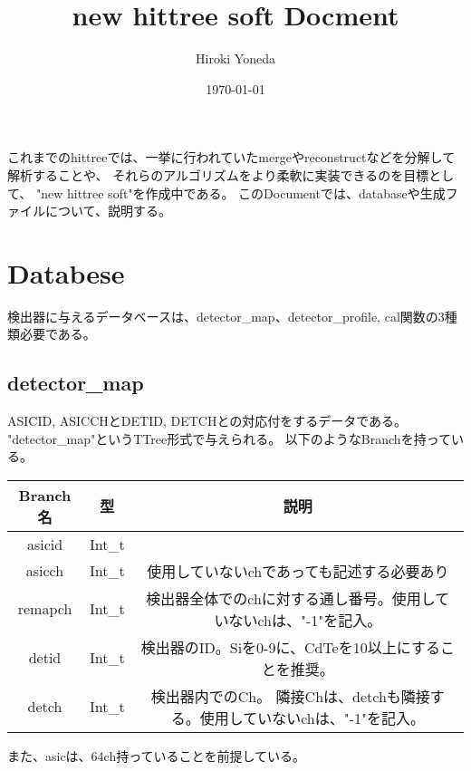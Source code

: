 \documentclass[10.5pt]{jsarticle}
\title{new hittree soft Docment}
\author{Hiroki Yoneda}
\date{\today}
\begin{document}
 
\maketitle 

これまでのhittreeでは、一挙に行われていたmergeやreconstructなどを分解して解析することや、
それらのアルゴリズムをより柔軟に実装できるのを目標として、
"new hittree soft"を作成中である。
このDocumentでは、databaseや生成ファイルについて、説明する。

\section{Databese}
検出器に与えるデータベースは、detector\_map、detector\_profile, cal関数の3種類必要である。
\subsection{detector\_map}
ASICID, ASICCHとDETID, DETCHとの対応付をするデータである。
"detector\_map"というTTree形式で与えられる。
以下のようなBranchを持っている。
\begin{table}[htb]
  \begin{tabular}{|c|c|c|} \hline
  Branch名 & 型 & 説明 \\ \hline
  asicid & Int\_t & \\
  asicch & Int\_t & 使用していないchであっても記述する必要あり\\
  remapch & Int\_t & 検出器全体でのchに対する通し番号。使用していないchは、"-1"を記入。\\
  detid & Int\_t  & 検出器のID。Siを0-9に、CdTeを10以上にすることを推奨。\\
  detch & Int\_t &  検出器内でのCh。 隣接Chは、detchも隣接する。使用していないchは、"-1"を記入。\\ \hline
  \end{tabular}
\end{table}
また、asicは、64ch持っていることを前提している。
\end{document}
